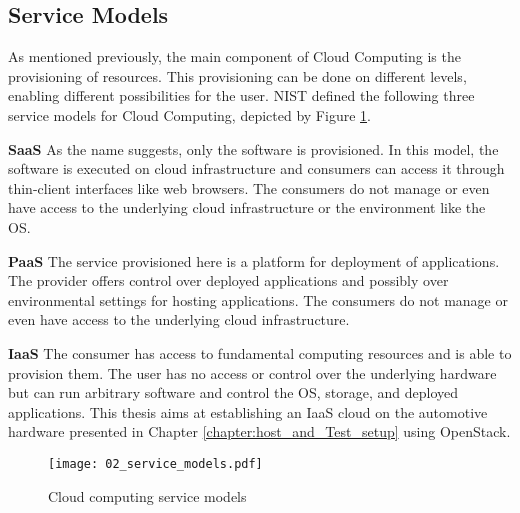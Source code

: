         \subsection{Service Models}
        \label{subsection:models}
        
            As mentioned previously, the main component of Cloud Computing is the provisioning of resources.
            This provisioning can be done on different levels, enabling different possibilities for the user.
            \ac{NIST} defined the following three service models for Cloud Computing, depicted by Figure \ref{figure:cloud_service_models}.
            
            \noindent \textbf{\ac{SaaS}} 
            As the name suggests, only the software is provisioned.
            In this model, the software is executed on cloud infrastructure and consumers can access it through thin-client interfaces like web browsers.
            The consumers do not manage or even have access to the underlying cloud infrastructure or the environment like the \ac{OS}.
            
            \noindent \textbf{\ac{PaaS}} 
            The service provisioned here is a platform for deployment of applications.
            The provider offers control over deployed applications and possibly over environmental settings for hosting applications.
            The consumers do not manage or even have access to the underlying cloud infrastructure.
            
            \noindent \textbf{\ac{IaaS}} 
            The consumer has access to fundamental computing resources and is able to provision them.
            The user has no access or control over the underlying hardware but can run arbitrary software and control the \ac{OS}, storage, and deployed applications.
            This thesis aims at establishing an \ac{IaaS} cloud on the automotive hardware presented in Chapter \ref{chapter:host_and_Test_setup} using OpenStack.
            
            \begin{figure}[ht]
                \begin{center} 
                    \texttt{[image: 02\_service\_models.pdf]} 
                    \caption{Cloud computing service models}
                    \label{figure:cloud_service_models}
                \end{center}	
            \end{figure}
        
